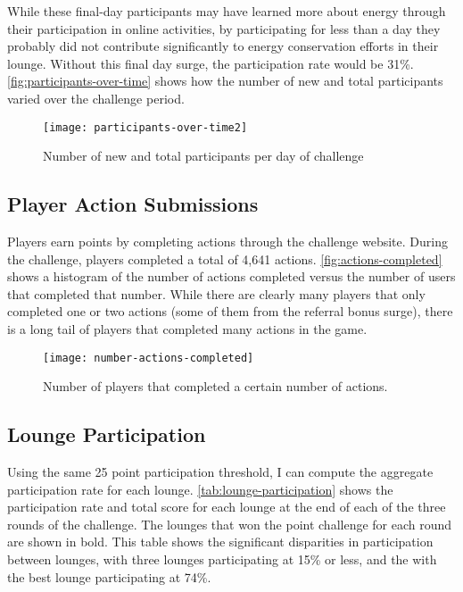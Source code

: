 While these final-day participants may have learned more about energy through their participation in online activities, by participating for less than a day they probably did not contribute significantly to energy conservation efforts in their lounge. Without this final day surge, the participation rate would be 31\%. \autoref{fig:participants-over-time} shows how the number of new and total participants varied over the challenge period.

\begin{figure}[htbp]
	\centering
	\texttt{[image: participants-over-time2]}
	\caption{Number of new and total participants per day of challenge}
	\label{fig:participants-over-time}
\end{figure}




\subsection{Player Action Submissions}

Players earn points by completing actions through the challenge website. During the challenge, players completed a total of 4,641 actions. \autoref{fig:actions-completed} shows a histogram of the number of actions completed versus the number of users that completed that number. While there are clearly many players that only completed one or two actions (some of them from the referral bonus surge), there is a long tail of players that completed many actions in the game.

\begin{figure}[htbp]
	\centering
	\texttt{[image: number-actions-completed]}
	\caption{Number of players that completed a certain number of actions.}
	\label{fig:actions-completed}
\end{figure}


\subsection{Lounge Participation}
\label{sec:lounge-participation}

Using the same 25 point participation threshold, I can compute the aggregate participation rate for each lounge. \autoref{tab:lounge-participation} shows the participation rate and total score for each lounge at the end of each of the three rounds of the challenge. The lounges that won the point challenge for each round are shown in bold. This table shows the significant disparities in participation between lounges, with three lounges participating at 15\% or less, and the with the best lounge participating at 74\%.

